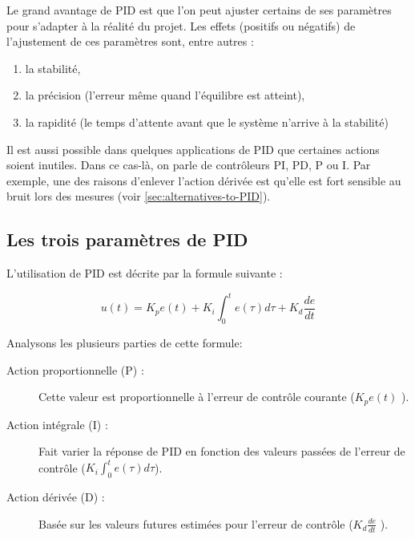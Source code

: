 Le grand avantage de PID est que l'on peut ajuster certains de ses paramètres pour s'adapter à la réalité du projet.
Les effets (positifs ou négatifs) de l'ajustement de ces paramètres sont, entre autres \cite{zhong2006pid} :
\begin{enumerate}
\item la stabilité,
\item la précision (l'erreur même quand l'équilibre est atteint),
\item la rapidité (le temps d'attente avant que le système n'arrive à la stabilité)
\end{enumerate}

Il est aussi possible dans quelques applications de PID que certaines actions soient inutiles.
Dans ce cas-là, on parle de contrôleurs PI, PD, P ou I.
Par exemple, une des raisons d'enlever l'action dérivée est qu'elle est fort sensible au bruit lors des mesures
(voir \ref{sec:alternatives-to-PID}).

\newpage

\subsection{Les trois paramètres de PID}

L'utilisation de PID est décrite par la formule suivante\cite{visioli2006practical} :

$$u(t) = K_p e(t) + K_i \int_{0}^{t} e(\tau) d\tau + K_d \frac{de}{dt}$$

Analysons les plusieurs parties de cette formule:

\begin{description}
\item[Action proportionnelle (P) :]
	Cette valeur est proportionnelle à l'erreur de contrôle courante ($K_p e(t)$ ).
\item[Action intégrale (I) :]
	Fait varier la réponse de PID en fonction des valeurs passées de l'erreur de contrôle ($K_i \int_{0}^{t} e(\tau) d\tau$).
\item[Action dérivée (D) :]
	Basée sur les valeurs futures estimées pour l'erreur de contrôle ($K_d \frac{de}{dt}$ ).
\end{description}
